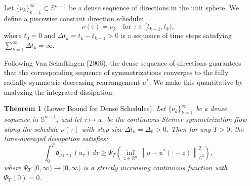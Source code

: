 \documentclass[11pt]{article}
\newtheorem{theorem}{Theorem}[section]
\theoremstyle{definition}
\newcommand{\R}{\mathbb R}
\newcommand{\Sph}{\mathbb S^{n-1}}
\newcommand{\norm}[1]{\left\|#1\right\|}
\begin{document}
Let $\{\nu_k\}_{k=1}^\infty \subset \Sph$ be a dense sequence of directions in the unit sphere. We define a piecewise constant direction schedule:
\begin{equation}
\nu(\tau) = \nu_k \quad \text{for } \tau \in [t_{k-1}, t_k),
\end{equation}
where $t_0 = 0$ and $\Delta t_k = t_k - t_{k-1} > 0$ is a sequence of time steps satisfying $\sum_{k=1}^\infty \Delta t_k = \infty$.

Following Van Schaftingen (2006), the dense sequence of directions guarantees that the corresponding sequence of symmetrizations converges to the fully radially symmetric decreasing rearrangement $u^*$. We make this quantitative by analyzing the integrated dissipation.

\begin{theorem}[Lower Bound for Dense Schedules]\label{thm:dense-schedule}
Let $\{\nu_k\}_{k=1}^\infty$ be a dense sequence in $\Sph$, and let $\tau \mapsto u_\tau$ be the continuous Steiner symmetrization flow along the schedule $\nu(\tau)$ with step size $\Delta t_k = \Delta_0 > 0$. Then for any $T > 0$, the time-averaged dissipation satisfies:
\begin{equation}
\int_0^T \mathfrak{d}_{\nu(\tau)}(u_\tau) \, d\tau \ge \Psi_T\left( \inf_{z\in\R^n} \norm{u - u^*(\cdot - z)}_{L^2}^2 \right),
\end{equation}
where $\Psi_T : [0, \infty) \to [0, \infty)$ is a strictly increasing continuous function with $\Psi_T(0) = 0$.
\end{theorem}
\end{document}
